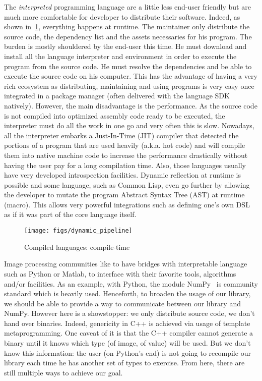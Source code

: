 The \emph{interpreted} programming language are a little less end-user friendly but are much more comfortable for
developer to distribute their software. Indeed, as shown in~\cref{fig:static.dynamic.dynamic.pipeline}, everything
happens at runtime. The maintainer only distribute the source code, the dependency list and the assets necessaries for
his program. The burden is mostly shouldered by the end-user this time. He must download and install all the language
interpreter and environment in order to execute the program from the source code. He must resolve the dependencies and
be able to execute the source code on his computer. This has the advantage of having a very rich ecosystem as
distributing, maintaining and using programs is very easy once integrated in a package manager (often delivered with the
language SDK natively). However, the main disadvantage is the performance. As the source code is not compiled into
optimized assembly code ready to be executed, the interpreter must do all the work in one go and very often this is
slow. Nowadays, all the interpreter embarks a Just-In-Time (JIT) compiler that detected the portions of a program that
are used heavily (a.k.a. hot code) and will compile them into native machine code to increase the performance
drastically without having the user pay for a long compilation time. Also, those languages usually have very developed
introspection facilities. Dynamic reflection at runtime is possible and some language, such as Common Lisp, even go
further by allowing the developer to mutate the program Abstract Syntax Tree (AST) at runtime (macro). This allows very
powerful integrations such as defining one's own DSL as if it was part of the core language itself.

\begin{figure}[tbh]
  \centering
  \texttt{[image: figs/dynamic\_pipeline]}
  \caption{Compiled languages: compile-time}
  \label{fig:static.dynamic.dynamic.pipeline}
\end{figure}

Image processing communities like to have bridges with interpretable language such as Python or Matlab, to interface
with their favorite tools, algorithms and/or facilities. As an example, with Python, the module
NumPy~\cite{oliphant.2006.numpy} is community standard which is heavily used. Henceforth, to broaden the usage of our
library, we should be able to provide a way to communicate between our library and NumPy. However here is a showstopper:
we only distribute source code, we don't hand over binaries. Indeed, genericity in C++ is achieved via usage of template
metaprogramming. One caveat of it is that the C++ compiler cannot generate a binary until it knows which type (of image,
of value) will be used. But we don't know this information: the user (on Python's end) is not going to recompile our
library each time he has another set of types to exercise. From here, there are still multiple ways to achieve our goal.

